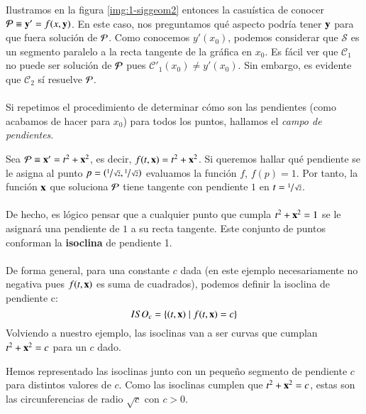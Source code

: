 Ilustramos en la figura \ref{img:1-siggeom2} entonces la casuística de conocer $\P \equiv \mbf{y'} = f(x,\mbf{y})$. En este caso, nos preguntamos qué aspecto podría tener $\mbf{y}$ para que fuera solución de $\P$. Como conocemos $y'(x_0)$, podemos considerar que $\mathcal{S}$ es un segmento paralelo a la recta tangente de la gráfica en $x_0$. Es fácil ver que $\mathcal{C}_1$ no puede ser solución de $\P$ pues $\mathcal{C}'_1(x_0) \neq y'(x_0)$. Sin embargo, es evidente que $\mathcal{C}_2$ sí resuelve $\P$.\\\\
Si repetimos el procedimiento de determinar cómo son las pendientes (como acabamos de hacer para $x_0$) para todos los puntos, hallamos el \textit{campo de pendientes}.

\begin{eg}\label{eg:campo-pendientes}
    Sea $\P \equiv \mbf{x'} = t^2 + \mbf{x}^2$, es decir, $f(t, \mbf{x}) = t^2 + \mbf{x}^2$. Si queremos hallar qué pendiente se le asigna al punto $p = (\sfrac{1}{\sqrt{2}},\sfrac{1}{\sqrt{2}})$ evaluamos la función $f$, $f(p) = 1$. Por tanto, la función $\mbf{x}$ que soluciona $\P$ tiene tangente con pendiente $1$ en $t = \sfrac{1}{\sqrt{2}}$.\\\\
    De hecho, es lógico pensar que a cualquier punto que cumpla $t^2 + \mbf{x}^2 = 1$ se le asignará una pendiente de $1$ a su recta tangente. Este conjunto de puntos conforman la \textbf{isoclina} de pendiente 1.\\\\
    De forma general, para una constante $c$ dada (en este ejemplo necesariamente no negativa pues $f(t, \mbf{x})$ es suma de cuadrados), podemos definir la isoclina de pendiente c:
    $$
    ISO_c = \left\{(t, \mbf{x}) \mid f(t, \mbf{x}) = c\right\}
    $$
    Volviendo a nuestro ejemplo, las isoclinas van a ser curvas que cumplan $t^2 + \mbf{x}^2 = c$ para un $c$ dado.\\
    \begin{minipage}[c]{0.3\linewidth}
      \begin{center}
      \end{center}
    \end{minipage}\hfill
    \begin{minipage}[c]{0.65\textwidth}
        Hemos representado las isoclinas junto con un pequeño segmento de pendiente $c$ para distintos valores de $c$. Como las isoclinas cumplen que $t^2 + \mbf{x}^2 = c$, estas son las circunferencias de radio $\sqrt{c}$ con $c > 0$.\\

\end{minipage}
\end{eg}
